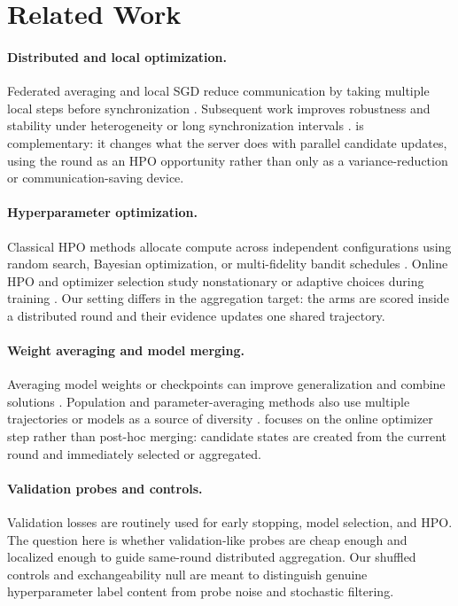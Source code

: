 \section{Related Work}
\label{sec:related}

\paragraph{Distributed and local optimization.}
Federated averaging and local SGD reduce communication by taking multiple
local steps before synchronization \citep{mcmahan2017communication,
stich2018local,li2020federated}. Subsequent work improves robustness and
stability under heterogeneity or long synchronization intervals
\citep{karimireddy2020scaffold,reddi2021adaptive,douillard2023diloco,
naganuma2025pseudo}. \method is complementary: it changes what the server does
with parallel candidate updates, using the round as an HPO opportunity rather
than only as a variance-reduction or communication-saving device.

\paragraph{Hyperparameter optimization.}
Classical HPO methods allocate compute across independent configurations using
random search, Bayesian optimization, or multi-fidelity bandit schedules
\citep{bergstra2012random,snoek2012practical,li2017hyperband,
falkner2018bohb}. Online HPO and optimizer selection study nonstationary or
adaptive choices during training \citep{kang2023onlinehpo,
naganuma2023optimizer}. Our setting differs in the aggregation target: the
arms are scored inside a distributed round and their evidence updates one
shared trajectory.

\paragraph{Weight averaging and model merging.}
Averaging model weights or checkpoints can improve generalization and combine
solutions \citep{izmailov2018averaging,wortsman2022model,verma2024merging}.
Population and parameter-averaging methods also use multiple trajectories or
models as a source of diversity \citep{jolicoeur2023papa}. \method focuses on
the online optimizer step rather than post-hoc merging: candidate states are
created from the current round and immediately selected or aggregated.

\paragraph{Validation probes and controls.}
Validation losses are routinely used for early stopping, model selection, and
HPO. The question here is whether validation-like probes are cheap enough and
localized enough to guide same-round distributed aggregation. Our shuffled
controls and exchangeability null are meant to distinguish genuine
hyperparameter label content from probe noise and stochastic filtering.
